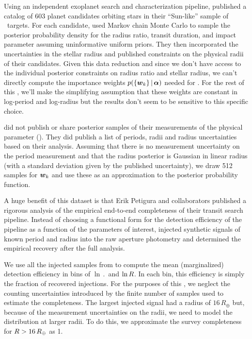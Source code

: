 Using an independent exoplanet search and characterization pipeline,
\citet{Petigura:2013} published a catalog of 603 planet candidates orbiting stars
in their ``Sun-like'' sample of \kepler\ targets.
For each candidate, \citet{Petigura:2013} used Markov chain Monte Carlo to sample
the posterior probability density for the radius ratio, transit duration, and
impact parameter assuming uninformative uniform priors.
They then incorporated the uncertainties in the stellar radius and published
constraints on the physical radii of their candidates.
Given this data reduction and since we don't have access to the individual
posterior constraints on radius ratio and stellar radius, we can't directly
compute the importance weights $p(\{{{\boldsymbol{w}}}_k\}\,|\,{{\boldsymbol{\alpha}}})$ needed for
.
For the rest of this \paper, we'll make the simplifying assumption that these
weights are constant in log-period and log-radius but the results don't seem
to be sensitive to this specific choice.

\citet{Petigura:2013} did not publish or share posterior samples of their
measurements of the physical parameter ().
They did publish a list of periods, radii and radius uncertainties based on
their analysis.
Assuming that there is no measurement uncertainty on the period measurement
and that the radius posterior is Gaussian in linear radius (with a standard
deviation given by the published uncertainty), we draw 512 samples for
${{\boldsymbol{w}}}_k$ and use these as an approximation to the posterior probability
function.

A huge benefit of this dataset is that Erik Petigura and collaborators
published a rigorous analysis of the empirical end-to-end completeness of
their transit search pipeline.
Instead of choosing a functional form for the detection efficiency of the
pipeline as a function of the parameters of interest, \citet{Petigura:2013}
injected synthetic signals of known period and radius into the raw aperture
photometry and determined the empirical recovery after the full analysis.

We use all the injected samples from \citet{Petigura:2013} to compute the mean
(marginalized) detection efficiency in bins of $\ln\period$ and $\ln R$.
In each bin, this efficiency is simply the fraction of recovered injections.
For the purposes of this \paper, we neglect the counting uncertainties
introduced by the finite number of samples used to estimate the completeness.
The largest injected signal had a radius of $16\,R_\oplus$ but, because of the
measurement uncertainties on the radii, we need to model the distribution at
larger radii.
To do this, we approximate the survey completeness for $R>16\,R_\oplus$
as 1.


